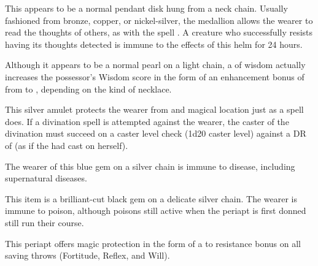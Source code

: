  This appears to be a normal pendant disk hung from a neck chain. Usually fashioned from bronze, copper, or nickel-silver, the medallion allows the wearer to read the thoughts of others, as with the spell . A creature who successfully resists having its thoughts detected is immune to the effects of this helm for 24 hours.

 Although it appears to be a normal pearl on a light chain, a  of wisdom actually increases the possessor's Wisdom score in the form of an enhancement bonus of from  to , depending on the kind of necklace.

 This silver amulet protects the wearer from  and magical location just as a  spell does. If a divination spell is attempted against the wearer, the caster of the divination must succeed on a caster level check (1d20 \add caster level) against a DR of  (as if the  had cast  on herself).

 The wearer of this blue gem on a silver chain is immune to disease, including supernatural diseases.

 This item is a brilliant-cut black gem on a delicate silver chain. The wearer is immune to poison, although poisons still active when the periapt is first donned still run their course.

 This periapt offers magic protection in the form of a  to  resistance bonus on all saving throws (Fortitude, Reflex, and Will).

